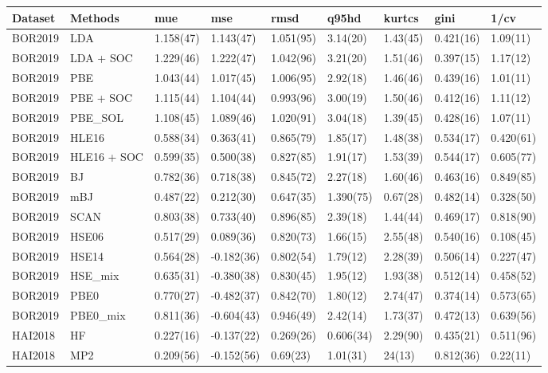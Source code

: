 \begin{table}[ht]
\centering
\begin{tabular}{lllllllll}
  \hline
Dataset & Methods & mue & mse & rmsd & q95hd & kurtcs & gini & 1/cv \\ 
  \hline
BOR2019 & LDA & 1.158(47) & 1.143(47) & 1.051(95) & 3.14(20) & 1.43(45) & 0.421(16) & 1.09(11) \\ 
  BOR2019 & LDA + SOC & 1.229(46) & 1.222(47) & 1.042(96) & 3.21(20) & 1.51(46) & 0.397(15) & 1.17(12) \\ 
  BOR2019 & PBE & 1.043(44) & 1.017(45) & 1.006(95) & 2.92(18) & 1.46(46) & 0.439(16) & 1.01(11) \\ 
  BOR2019 & PBE + SOC & 1.115(44) & 1.104(44) & 0.993(96) & 3.00(19) & 1.50(46) & 0.412(16) & 1.11(12) \\ 
  BOR2019 & PBE\_SOL & 1.108(45) & 1.089(46) & 1.020(91) & 3.04(18) & 1.39(45) & 0.428(16) & 1.07(11) \\ 
  BOR2019 & HLE16 & 0.588(34) & 0.363(41) & 0.865(79) & 1.85(17) & 1.48(38) & 0.534(17) & 0.420(61) \\ 
  BOR2019 & HLE16 + SOC & 0.599(35) & 0.500(38) & 0.827(85) & 1.91(17) & 1.53(39) & 0.544(17) & 0.605(77) \\ 
  BOR2019 & BJ & 0.782(36) & 0.718(38) & 0.845(72) & 2.27(18) & 1.60(46) & 0.463(16) & 0.849(85) \\ 
  BOR2019 & mBJ & 0.487(22) & 0.212(30) & 0.647(35) & 1.390(75) & 0.67(28) & 0.482(14) & 0.328(50) \\ 
  BOR2019 & SCAN & 0.803(38) & 0.733(40) & 0.896(85) & 2.39(18) & 1.44(44) & 0.469(17) & 0.818(90) \\ 
  BOR2019 & HSE06 & 0.517(29) & 0.089(36) & 0.820(73) & 1.66(15) & 2.55(48) & 0.540(16) & 0.108(45) \\ 
  BOR2019 & HSE14 & 0.564(28) & -0.182(36) & 0.802(54) & 1.79(12) & 2.28(39) & 0.506(14) & 0.227(47) \\ 
  BOR2019 & HSE\_mix & 0.635(31) & -0.380(38) & 0.830(45) & 1.95(12) & 1.93(38) & 0.512(14) & 0.458(52) \\ 
  BOR2019 & PBE0 & 0.770(27) & -0.482(37) & 0.842(70) & 1.80(12) & 2.74(47) & 0.374(14) & 0.573(65) \\ 
  BOR2019 & PBE0\_mix & 0.811(36) & -0.604(43) & 0.946(49) & 2.42(14) & 1.73(37) & 0.472(13) & 0.639(56) \\ 
  HAI2018 & HF & 0.227(16) & -0.137(22) & 0.269(26) & 0.606(34) & 2.29(90) & 0.435(21) & 0.511(96) \\ 
  HAI2018 & MP2 & 0.209(56) & -0.152(56) & 0.69(23) & 1.01(31) & 24(13) & 0.812(36) & 0.22(11) \\ 

\end{tabular}
\end{table}
